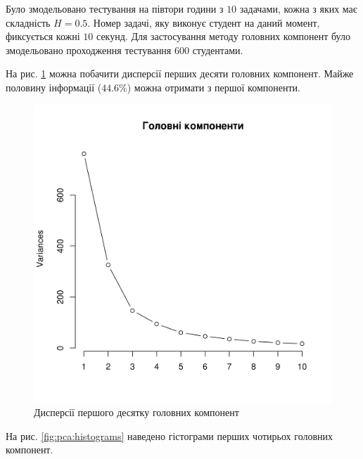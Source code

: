Було змодельовано тестування на півтори години з $10$ задачами,
кожна з яких має складність $H=0.5$.
Номер задачі, яку виконує студент на даний момент, фиксується кожні $10$
секунд.
Для застосування методу головних компонент
було змодельовано проходження тестування $600$ студентами.

На рис. \ref{fig:pca:main} можна побачити дисперсії перших десяти головних
компонент.
Майже половину інформації ($44.6\%$) можна отримати з першої компоненти.
\begin{figure}[h]
  \centering
    \includegraphics[width=\textwidth]{images/pca}
  \caption{Дисперсії першого десятку головних компонент}
  \label{fig:pca:main}
\end{figure}
На рис. \ref{fig:pca:histograms} наведено гістограми перших чотирьох
головних компонент.
